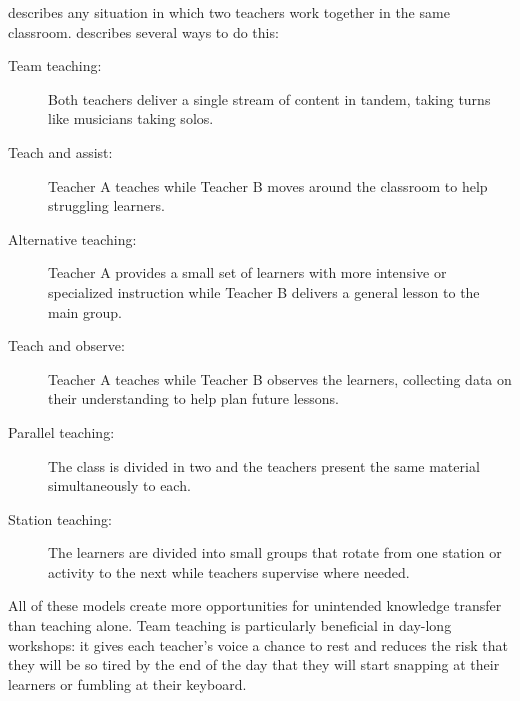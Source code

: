 
 describes any situation
in which two teachers work together in the same classroom.
\cite{Frie2016} describes several ways to do this:

\begin{description}

\item[Team teaching:]
  Both teachers deliver a single stream of content in tandem,
  taking turns like musicians taking solos.

\item[Teach and assist:]
  Teacher A teaches while Teacher B moves around the classroom
  to help struggling learners.

\item[Alternative teaching:]
  Teacher A provides a small set of learners with more intensive or specialized instruction
  while Teacher B delivers a general lesson to the main group.

\item[Teach and observe:]
  Teacher A teaches while Teacher B observes the learners,
  collecting data on their understanding to help plan future lessons.

\item[Parallel teaching:]
  The class is divided in two
  and the teachers present the same material simultaneously to each.

\item[Station teaching:]
  The learners are divided into small groups
  that rotate from one station or activity to the next
  while teachers supervise where needed.

\end{description}

All of these models create more opportunities for unintended knowledge transfer than teaching alone.
Team teaching is particularly beneficial in day-long workshops:
it gives each teacher's voice a chance to rest
and reduces the risk that they will be so tired by the end of the day
that they will start snapping at their learners
or fumbling at their keyboard.

